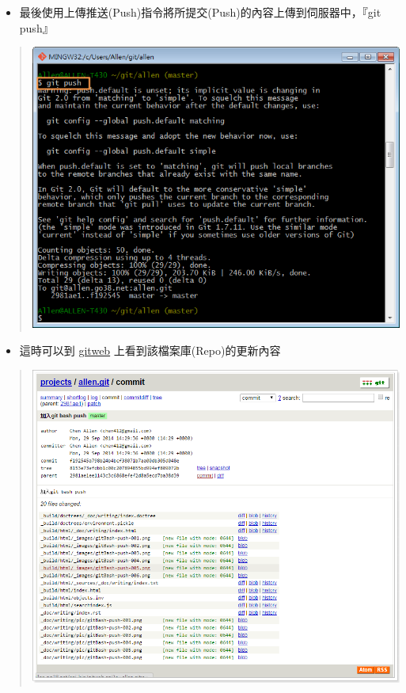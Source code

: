 \documentclass[letterpaper,10pt,english]{sphinxmanual}
\begin{document}
\begin{itemize}
\item {} 
最後使用上傳推送(Push)指令將所提交(Push)的內容上傳到伺服器中，『git push』

\end{itemize}
\begin{quote}

\includegraphics{gitBash-push-005.png}
\end{quote}
\begin{itemize}
\item {} 
這時可以到 \href{http://allen.go38.net/cgi-bin/gitweb.cgi}{gitweb} 上看到該檔案庫(Repo)的更新內容

\end{itemize}
\begin{quote}

\includegraphics{gitBash-push-006.png}
\end{quote}
\end{document}
